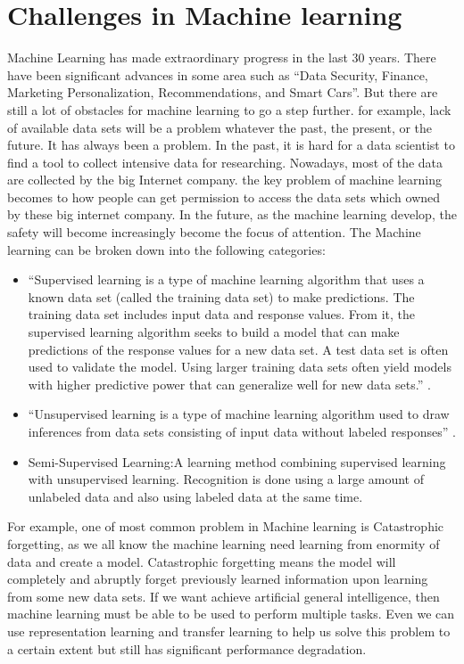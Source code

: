 \documentclass[sigconf]{acmart}
\begin{document}
\section{Challenges in Machine learning}
Machine Learning has made extraordinary progress in the last 30 years. There have been significant advances in some area such as ``Data Security, Finance, Marketing Personalization, Recommendations, and Smart Cars''. But there are still a lot of obstacles for machine learning to go a step further. for example, lack of available data sets will be a problem whatever the past, the present, or the future. It has always been a problem. In the past, it is hard for a data scientist to find a tool to collect intensive data for researching. Nowadays, most of the data are collected by the big Internet company. the key problem of machine learning becomes to how people can get permission to access the data sets which owned by these big internet company. In the future, as the machine learning develop, the safety will become increasingly become the focus of attention. The Machine learning can be broken down into the following categories:
\begin{itemize}

  \item ``Supervised learning is a type of machine learning algorithm that uses a known data set (called the training data set) to make predictions. The training data set includes input data and response values. From it, the supervised learning algorithm seeks to build a model that can make predictions of the response values for a new data set. A test data set is often used to validate the model. Using larger training data sets often yield models with higher predictive power that can generalize well for new data sets.'' \cite{Mathworks02}.
  
  
  \item ``Unsupervised learning is a type of machine learning algorithm used to draw inferences from data sets consisting of input data without labeled responses'' \cite{Mathworks01}.
  
  
  \item Semi-Supervised Learning:A learning method combining supervised learning with unsupervised learning. Recognition is done using a large amount of unlabeled data and also using labeled data at the same time.
  

  
\end{itemize}
For example, one of most common problem in Machine learning is Catastrophic forgetting, as we all know the machine learning need learning from enormity of data and create a model. Catastrophic forgetting means the model will completely and abruptly forget previously learned information upon learning from some new data sets. If we want achieve artificial general intelligence, then machine learning must be able to be used to perform multiple tasks. Even we can use representation learning and transfer learning to help us solve this problem to a certain extent but still has significant performance degradation.
\end{document}
